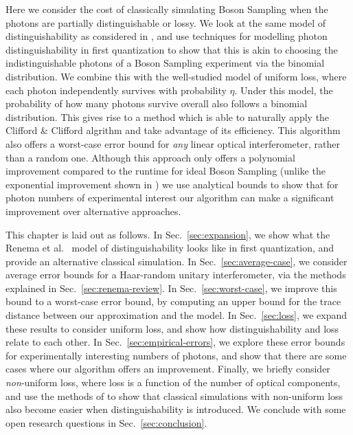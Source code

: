 Here we consider the cost of classically simulating Boson Sampling when the photons are partially distinguishable or lossy.
We look at the same model of distinguishability as considered in \cite{renema2018,renema2018loss}, and use techniques for modelling photon distinguishability in first quantization \cite{moylett2018, stanisic2018} to show that this is akin to choosing the indistinguishable photons of a Boson Sampling experiment via the binomial distribution. 
We combine this with the well-studied model of uniform loss, where each photon independently survives with probability $\eta$. Under this model, the probability of how many photons survive overall also follows a binomial distribution. 
This gives rise to a method which is able to naturally apply the Clifford \& Clifford algrithm and take advantage of its efficiency. This algorithm also offers a worst-case error bound for \textit{any} linear optical interferometer, rather than a random one.
Although this approach only offers a polynomial improvement compared to the runtime for ideal Boson Sampling (unlike the exponential improvement shown in \cite{renema2018,renema2018loss}) we use analytical bounds to show that for photon numbers of experimental interest our algorithm can make a significant improvement over alternative approaches. 

This chapter is laid out as follows.
In Sec.\ \ref{sec:expansion}, we show what the Renema et al.~\cite{renema2018, renema2018loss} model of distinguishability looks like in first quantization, and provide an alternative classical simulation. 
In Sec.\ \ref{sec:average-case}, we consider average error bounds for a Haar-random unitary interferometer, via the methods explained in Sec.\ \ref{sec:renema-review}. 
In Sec.\ \ref{sec:worst-case}, we improve this bound to a worst-case error bound, by computing an upper bound for the trace distance between our approximation and the model. 
In Sec.\ \ref{sec:loss}, we expand these results to consider uniform loss, and show how distinguishability and loss relate to each other. 
In Sec.\ \ref{sec:empirical-errors}, we explore these error bounds for experimentally interesting numbers of photons, and show that there are some cases where our algorithm offers an improvement. 
Finally, we briefly consider \emph{non}-uniform loss, where loss is a function of the number of optical components, and use the methods of \cite{garciapatron2017, oszmaniec2018} to show that classical simulations with non-uniform loss also become easier when distinguishability is introduced.
We conclude with some open research questions in Sec.\ \ref{sec:conclusion}.

